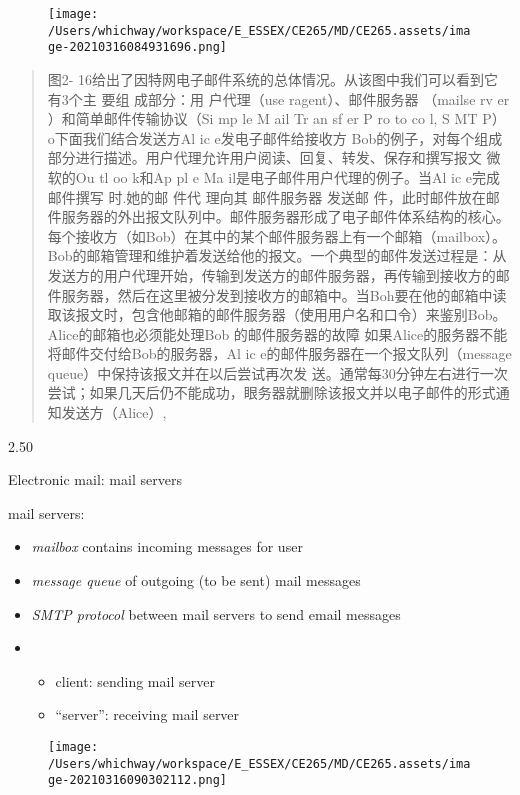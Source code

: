 \documentclass[
]{article}
\begin{document}
\begin{figure}
\centering
\texttt{[image: /Users/whichway/workspace/E\_ESSEX/CE265/MD/CE265.assets/image-20210316084931696.png]}
\caption{}
\end{figure}

\begin{quote}
图2- 16给出了因特网电子邮件系统的总体情况。从该图中我们可以看到它有3个主
要组 成部分：用 户代理（use ragent）、邮件服务器 （mailse rv er
）和简单邮件传输协议（Si mp le M ail Tr an sf er P ro to co l, S MT P）
o下面我们结合发送方Al ic e发电子邮件给接收方
Bob的例子，对每个组成部分进行描述。用户代理允许用户阅读、回复、转发、保存和撰写报文
微软的Ou tl oo k和Ap pl e Ma il是电子邮件用户代理的例子。当Al ic
e完成邮件撰写 时.她的邮 件代 理向其 邮件服务器 发送邮
件，此时邮件放在邮件服务器的外出报文队列中。邮件服务器形成了电子邮件体系结构的核心。每个接收方（如Bob）在其中的某个邮件服务器上有一个邮箱（mailbox）。Bob的邮箱管理和维护着发送给他的报文。一个典型的邮件发送过程是：从发送方的用户代理开始，传输到发送方的邮件服务器，再传输到接收方的邮件服务器，然后在这里被分发到接收方的邮箱中。当Boh要在他的邮箱中读取该报文时，包含他邮箱的邮件服务器（使用用户名和口令）来鉴别Bob。Alice的邮箱也必须能处理Bob
的邮件服务器的故障 如果Alice的服务器不能将邮件交付给Bob的服务器，Al ic
e的邮件服务器在一个报文队列（message
queue）中保持该报文并在以后尝试再次发
送。通常每30分钟左右进行一次尝试；如果几天后仍不能成功，眼务器就删除该报文并以电子邮件的形式通知发送方（Alice）,
\end{quote}

2.50

Electronic mail: mail servers

mail servers:

\begin{itemize}
\item
  \emph{mailbox} contains incoming messages for user
\item
  \emph{message queue} of outgoing (to be sent) mail messages
\item
  \emph{SMTP protocol} between mail servers to send email messages
\item
  \begin{itemize}
  \item
    client: sending mail server
  \item
    ``server'': receiving mail server
  \end{itemize}
\end{itemize}

\begin{figure}
\centering
\texttt{[image: /Users/whichway/workspace/E\_ESSEX/CE265/MD/CE265.assets/image-20210316090302112.png]}
\caption{}
\end{figure}
\end{document}
